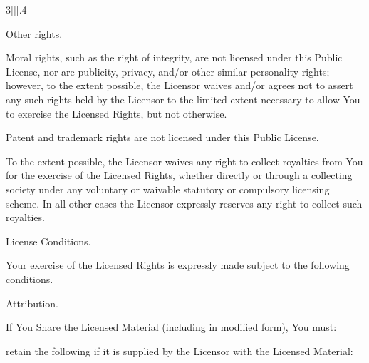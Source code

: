 \documentclass[8pt,a4paper]{article}
\begin{document}
\begin{multicols}{3}[][.4\paperwidth]
\begin{longenum}
\begin{longenum}
\begin{longenum}
       \end{longenum}

  \item Other rights.

       \begin{longenum}

       \item Moral rights, such as the right of integrity, are not
          licensed under this Public License, nor are publicity,
          privacy, and/or other similar personality rights; however, to
          the extent possible, the Licensor waives and/or agrees not to
          assert any such rights held by the Licensor to the limited
          extent necessary to allow You to exercise the Licensed
          Rights, but not otherwise.

       \item Patent and trademark rights are not licensed under this
          Public License.

       \item To the extent possible, the Licensor waives any right to
          collect royalties from You for the exercise of the Licensed
          Rights, whether directly or through a collecting society
          under any voluntary or waivable statutory or compulsory
          licensing scheme. In all other cases the Licensor expressly
          reserves any right to collect such royalties.

       \end{longenum}

  \end{longenum}

 \item License Conditions.

  Your exercise of the Licensed Rights is expressly made subject
  to the following conditions.

  \begin{longenum}
  \item Attribution.

       \begin{longenum}

       \item If You Share the Licensed Material (including in modified
          form), You must:

            \begin{longenum}

            \item retain the following if it is supplied by the Licensor
               with the Licensed Material:


\end{longenum}
\end{longenum}
\end{longenum}
\end{longenum}
\end{multicols}
\end{document}
